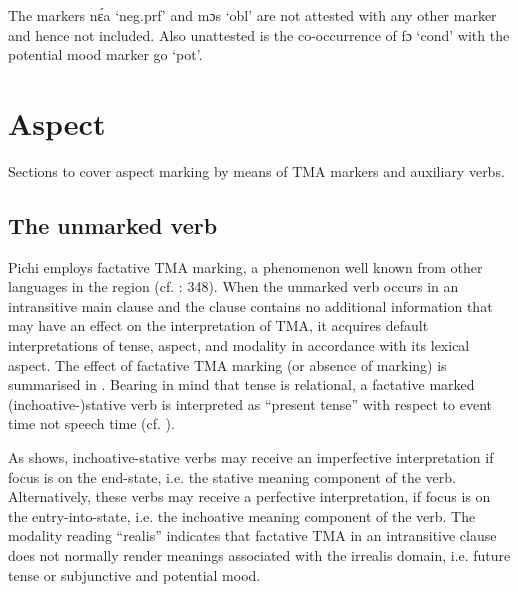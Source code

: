 The markers nɛ́a ‘neg.prf’ and mɔs ‘obl’ are not attested with any other marker and hence not included. Also unattested is the co-occurrence of fɔ ‘cond’ with the potential mood marker go ‘pot’. 


\section{Aspect}\label{sec:6.3}

Sections  to  cover aspect marking by means of TMA markers and auxiliary verbs. 

\subsection{The unmarked verb}\label{sec:6.3.1}

Pichi employs factative TMA marking, a phenomenon well known from other languages in the region (cf. \citealt{Welmers1973}: 348). When the unmarked verb occurs in an intransitive main clause and the clause contains no additional information that may have an effect on the interpretation of TMA, it acquires default interpretations of tense, aspect, and modality in accordance with its lexical aspect. The effect of factative TMA marking (or absence of marking) is summarised in . Bearing in mind that tense is relational, a factative marked (inchoative-)stative verb is interpreted as “present tense” with respect to event time not speech time (cf. ). 


As  shows, inchoative-stative verbs may receive an imperfective interpretation if focus is on the end-state, i.e. the stative meaning component of the verb. Alternatively, these verbs may receive a perfective interpretation, if focus is on the entry-into-state, i.e. the inchoative meaning component of the verb. The modality reading “realis” indicates that factative TMA in an intransitive clause does not normally render meanings associated with the irrealis domain, i.e. future tense or subjunctive and potential mood. 


